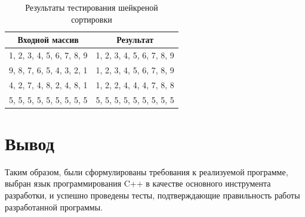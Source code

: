 \begin{table}[H]
    \centering
    \caption{Результаты тестирования шейкреной сортировки}
    \label{table:shres}
    \begin{tabular}{|c|c|}
        \hline
        Входной массив & Результат \\
        \hline
        1, 2, 3, 4, 5, 6, 7, 8, 9 & 1, 2, 3, 4, 5, 6, 7, 8, 9 \\
        \hline
        9, 8, 7, 6, 5, 4, 3, 2, 1 & 1, 2, 3, 4, 5, 6, 7, 8, 9 \\
        \hline
        4, 2, 7, 4, 8, 2, 4, 8, 1 & 1, 2, 2, 4, 4, 4, 7, 8, 8 \\
        \hline
        5, 5, 5, 5, 5, 5, 5, 5, 5 & 5, 5, 5, 5, 5, 5, 5, 5, 5 \\
        \hline
    \end{tabular}
\end{table}


\section{Вывод}
Таким образом, были сформулированы требования к реализуемой программе, выбран язык программирования C++ в качестве основного инструмента разработки, и успешно проведены тесты, подтверждающие правильность работы разработанной программы.

